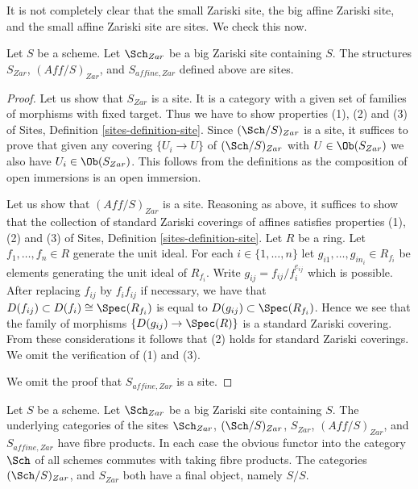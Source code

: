 \noindent
It is not completely clear that the small Zariski site,
the big affine Zariski site, and the small affine Zariski site
are sites. We check this now.

\begin{lemma}
\label{lemma-verify-site-Zariski}
Let $S$ be a scheme. Let $\Sch_{Zar}$ be a big Zariski
site containing $S$. The structures $S_{Zar}$, $(\textit{Aff}/S)_{Zar}$,
and $S_{affine, Zar}$ defined above are sites.
\end{lemma}

\begin{proof}
Let us show that $S_{Zar}$ is a site. It is a category with a
given set of families of morphisms with fixed target. Thus we
have to show properties (1), (2) and (3) of
Sites, Definition \ref{sites-definition-site}.
Since $(\Sch/S)_{Zar}$ is a site, it suffices to prove
that given any covering $\{U_i \to U\}$ of $(\Sch/S)_{Zar}$
with $U \in \Ob(S_{Zar})$ we also have $U_i \in \Ob(S_{Zar})$.
This follows from the definitions
as the composition of open immersions is an open immersion.

\medskip\noindent
Let us show that $(\textit{Aff}/S)_{Zar}$ is a site.
Reasoning as above, it suffices to show that the collection
of standard Zariski coverings of affines satisfies properties
(1), (2) and (3) of
Sites, Definition \ref{sites-definition-site}.
Let $R$ be a ring. Let $f_1, \ldots, f_n \in R$ generate the unit ideal.
For each $i \in \{1, \ldots, n\}$ let $g_{i1}, \ldots, g_{in_i} \in R_{f_i}$
be elements generating the unit ideal of $R_{f_i}$. Write
$g_{ij} = f_{ij}/f_i^{e_{ij}}$ which is possible. After replacing
$f_{ij}$ by $f_i f_{ij}$ if necessary, we have that
$D(f_{ij}) \subset D(f_i) \cong \Spec(R_{f_i})$ is
equal to $D(g_{ij}) \subset \Spec(R_{f_i})$. Hence we see that
the family of morphisms $\{D(g_{ij}) \to \Spec(R)\}$
is a standard Zariski covering. From these considerations
it follows that (2) holds for standard Zariski coverings.
We omit the verification of (1) and (3).

\medskip\noindent
We omit the proof that $S_{affine, Zar}$ is a site.
\end{proof}

\begin{lemma}
\label{lemma-fibre-products-Zariski}
Let $S$ be a scheme. Let $\Sch_{Zar}$ be a big Zariski
site containing $S$. The underlying categories of the sites
$\Sch_{Zar}$, $(\Sch/S)_{Zar}$,
$S_{Zar}$, $(\textit{Aff}/S)_{Zar}$, and $S_{affine, Zar}$ have fibre products.
In each case the obvious functor into the category $\Sch$ of
all schemes commutes with taking fibre products. The categories
$(\Sch/S)_{Zar}$, and $S_{Zar}$ both have a final object,
namely $S/S$.
\end{lemma}

